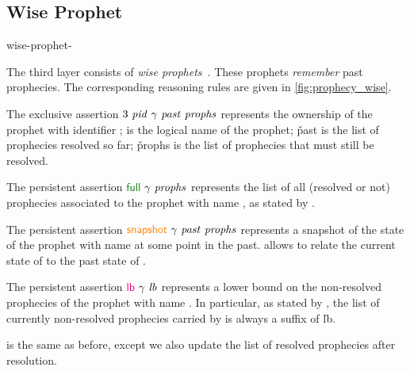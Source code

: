 \subsection{Wise Prophet}
\label{sec:prophecy_wise}

\begin{tirPrefix}{wise-prophet-}



The third layer consists of \emph{wise prophets}~.
These prophets \emph{remember} past prophecies.
The corresponding reasoning rules are given in \cref{fig:prophecy_wise}.

The exclusive assertion $\model\ \zooProph\ \iGname\ \v{past}\ \v{prophs}$ represents the ownership of the prophet with identifier \zooProph; \iGname is the logical name of the prophet; \v{past} is the list of prophecies resolved so far; \v{prophs} is the list of prophecies that must still be resolved.

The persistent assertion $\full\ \iGname\ \v{prophs}$ represents the list of all (resolved or not) prophecies associated to the prophet with name \iGname, as stated by .

The persistent assertion $\snapshot\ \iGname\ \v{past}\ \v{prophs}$ represents a snapshot of the state of the prophet with name \iGname at some point in the past.
 allows to relate the current state of \model to the past state of \snapshot.

The persistent assertion $\lb\ \iGname\ \v{lb}$ represents a lower bound on the non-resolved prophecies of the prophet with name \iGname.
In particular, as stated by , the list of currently non-resolved prophecies carried by \model is always a suffix of \v{lb}.

 is the same as before, except we also update the list of resolved prophecies after resolution.

\end{tirPrefix}
